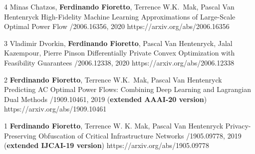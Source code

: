 \begin{pubs}
\wsentry
	{4}%
	{Minas Chatzos, {\bf Ferdinando Fioretto}, Terrence W.K.~Mak, Pascal Van Hentenryck}
	{High-Fidelity Machine Learning Approximations of Large-Scale Optimal Power Flow}
	{/2006.16356, 2020}
	{https://arxiv.org/abs/2006.16356}

\wsentry
	{3}%
	{Vladimir Dvorkin, {\bf Ferdinando Fioretto}, Pascal Van Hentenryck, Jalal Kazempour, Pierre Pinson}
	{Differentially Private Convex Optimization with Feasibility Guarantees}
	{/2006.12338, 2020}
	{https://arxiv.org/abs/2006.12338}

\wsentry
	{2}%
	{{\bf Ferdinando Fioretto}, Terrence W.K.~Mak, Pascal Van Hentenryck}
	{Predicting AC Optimal Power Flows: Combining Deep Learning and Lagrangian Dual Methods}
	{/1909.10461, 2019 ({\bf extended AAAI-20 version})}
	{https://arxiv.org/abs/1909.10461}

\wsentry
	{1}%
	{{\bf Ferdinando Fioretto}, Terrence W. K. Mak, Pascal Van Hentenryck}
	{Privacy-Preserving Obfuscation of Critical Infrastructure Networks} 
	{/1905.09778, 2019 ({\bf extended IJCAI-19 version})}
	{https://arxiv.org/abs/1905.09778}

\end{pubs}